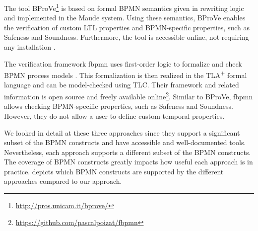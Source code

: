 \documentclass[submission, copyright, creativecommons]{eptcs}
\begin{document}
The tool BProVe\footnote{\url{http://pros.unicam.it/bprove/}} is based on formal BPMN semantics given in rewriting logic and implemented in the Maude system.
Using these semantics, BProVe enables the verification of custom LTL properties and BPMN-specific properties, such as Safeness and Soundness.
Furthermore, the tool is accessible online, not requiring any installation \cite{corradiniFormalApproachAnalysis2021}.

The verification framework \textsf{fbpmn} uses first-order logic to formalize and check BPMN process models \cite{houhouFirstOrderLogicVerification2022}.
This formalization is then realized in the TLA\textsuperscript{+} formal language and can be model-checked using TLC.
Their framework and related information is open source and freely available online\footnote{\url{https://github.com/pascalpoizat/fbpmn}}.
Similar to BProVe, \textsf{fbpmn} allows checking BPMN-specific properties, such as Safeness and Soundness.
However, they do not allow a user to define custom temporal properties.

We looked in detail at these three approaches since they support a significant subset of the BPMN constructs and have accessible and well-documented tools.
Nevertheless, each approach supports a different subset of the BPMN constructs.
The coverage of BPMN constructs greatly impacts how useful each approach is in practice.
 depicts which BPMN constructs are supported by the different approaches compared to our approach.
\end{document}
